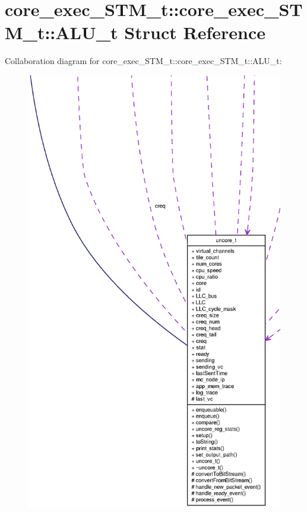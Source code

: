 \section{core\_\-exec\_\-STM\_\-t::core\_\-exec\_\-STM\_\-t::ALU\_\-t Struct Reference}
\label{structcore__exec__STM__t_1_1ALU__t}
Collaboration diagram for core\_\-exec\_\-STM\_\-t::core\_\-exec\_\-STM\_\-t::ALU\_\-t:\nopagebreak
\begin{figure}[H]
\begin{center}
\leavevmode
\includegraphics[width=400pt]{structcore__exec__STM__t_1_1ALU__t__coll__graph}
\end{center}
\end{figure}
